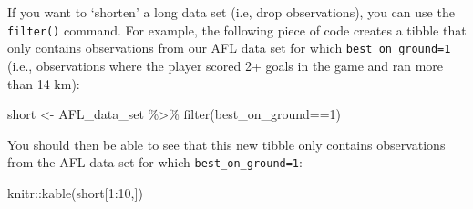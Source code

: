 \documentclass[
]{article}
\newenvironment{Shaded}{\begin{snugshade}}{\end{snugshade}}
\newcommand{\DecValTok}[1]{\textcolor[rgb]{0.00,0.00,0.81}{#1}}
\newcommand{\FunctionTok}[1]{\textcolor[rgb]{0.00,0.00,0.00}{#1}}
\newcommand{\NormalTok}[1]{#1}
\newcommand{\OtherTok}[1]{\textcolor[rgb]{0.56,0.35,0.01}{#1}}
\newcommand{\SpecialCharTok}[1]{\textcolor[rgb]{0.00,0.00,0.00}{#1}}
\begin{document}
If you want to `shorten' a long data set (i.e, drop observations), you
can use the \texttt{filter()} command. For example, the following piece
of code creates a tibble that only contains observations from our AFL
data set for which \texttt{best\_on\_ground=1} (i.e., observations where
the player scored 2+ goals in the game and ran more than 14 km):

\begin{Shaded}
\begin{Highlighting}[]
\NormalTok{short }\OtherTok{\textless{}{-}}\NormalTok{ AFL\_data\_set }\SpecialCharTok{\%\textgreater{}\%}
  \FunctionTok{filter}\NormalTok{(best\_on\_ground}\SpecialCharTok{==}\DecValTok{1}\NormalTok{)}
\end{Highlighting}
\end{Shaded}

You should then be able to see that this new tibble only contains
observations from the AFL data set for which
\texttt{best\_on\_ground=1}:

\begin{Shaded}
\begin{Highlighting}[]
\NormalTok{knitr}\SpecialCharTok{::}\FunctionTok{kable}\NormalTok{(short[}\DecValTok{1}\SpecialCharTok{:}\DecValTok{10}\NormalTok{,])}
\end{Highlighting}
\end{Shaded}
\end{document}
